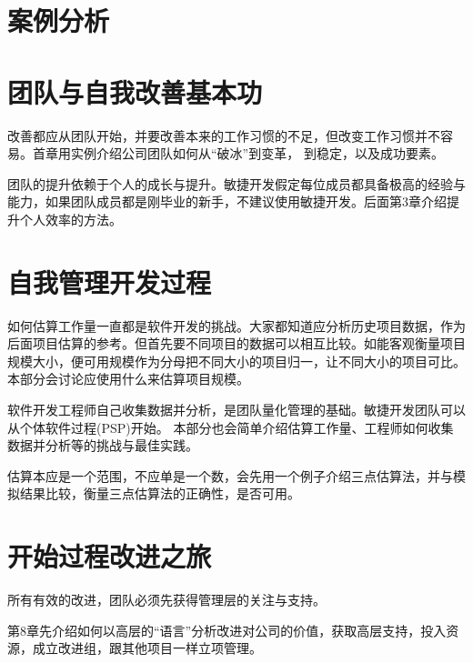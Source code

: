 \documentclass{book}        %
\begin{document}
\part{案例分析}



\part{团队与自我改善基本功}改善都应从团队开始，并要改善本来的工作习惯的不足，但改变工作习惯并不容易。首章用实例介绍公司团队如何从“破冰”到变革， 到稳定，以及成功要素。

团队的提升依赖于个人的成长与提升。敏捷开发假定每位成员都具备极高的经验与能力，如果团队成员都是刚毕业的新手，不建议使用敏捷开发。后面第3章介绍提升个人效率的方法。 




\part{自我管理开发过程}如何估算工作量一直都是软件开发的挑战。大家都知道应分析历史项目数据，作为后面项目估算的参考。但首先要不同项目的数据可以相互比较。如能客观衡量项目规模大小，便可用规模作为分母把不同大小的项目归一，让不同大小的项目可比。本部分会讨论应使用什么来估算项目规模。

软件开发工程师自己收集数据并分析，是团队量化管理的基础。敏捷开发团队可以从个体软件过程(PSP)开始。 本部分也会简单介绍估算工作量、工程师如何收集数据并分析等的挑战与最佳实践。

估算本应是一个范围，不应单是一个数，会先用一个例子介绍三点估算法，并与模拟结果比较，衡量三点估算法的正确性，是否可用。 
















\part{开始过程改进之旅}所有有效的改进，团队必须先获得管理层的关注与支持。

第8章先介绍如何以高层的“语言”分析改进对公司的价值，获取高层支持，投入资源，成立改进组，跟其他项目一样立项管理。
\end{document}
